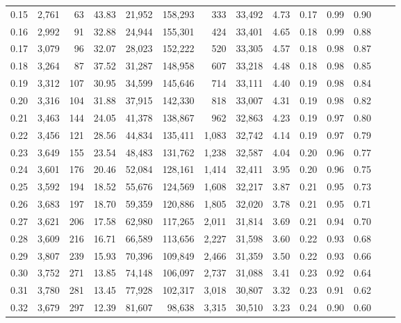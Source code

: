\begin{tabular}{rrrrrrrrrrrrrr}
0.15 &  2,761 &   63 &   43.83 &   21,952 &  158,293 &     333 &  33,492 &  4.73 &  0.17 &  0.99 &      0.90 \\
0.16 &  2,992 &   91 &   32.88 &   24,944 &  155,301 &     424 &  33,401 &  4.65 &  0.18 &  0.99 &      0.88 \\
0.17 &  3,079 &   96 &   32.07 &   28,023 &  152,222 &     520 &  33,305 &  4.57 &  0.18 &  0.98 &      0.87 \\
0.18 &  3,264 &   87 &   37.52 &   31,287 &  148,958 &     607 &  33,218 &  4.48 &  0.18 &  0.98 &      0.85 \\
0.19 &  3,312 &  107 &   30.95 &   34,599 &  145,646 &     714 &  33,111 &  4.40 &  0.19 &  0.98 &      0.84 \\
0.20 &  3,316 &  104 &   31.88 &   37,915 &  142,330 &     818 &  33,007 &  4.31 &  0.19 &  0.98 &      0.82 \\
0.21 &  3,463 &  144 &   24.05 &   41,378 &  138,867 &     962 &  32,863 &  4.23 &  0.19 &  0.97 &      0.80 \\
0.22 &  3,456 &  121 &   28.56 &   44,834 &  135,411 &   1,083 &  32,742 &  4.14 &  0.19 &  0.97 &      0.79 \\
0.23 &  3,649 &  155 &   23.54 &   48,483 &  131,762 &   1,238 &  32,587 &  4.04 &  0.20 &  0.96 &      0.77 \\
0.24 &  3,601 &  176 &   20.46 &   52,084 &  128,161 &   1,414 &  32,411 &  3.95 &  0.20 &  0.96 &      0.75 \\
0.25 &  3,592 &  194 &   18.52 &   55,676 &  124,569 &   1,608 &  32,217 &  3.87 &  0.21 &  0.95 &      0.73 \\
0.26 &  3,683 &  197 &   18.70 &   59,359 &  120,886 &   1,805 &  32,020 &  3.78 &  0.21 &  0.95 &      0.71 \\
0.27 &  3,621 &  206 &   17.58 &   62,980 &  117,265 &   2,011 &  31,814 &  3.69 &  0.21 &  0.94 &      0.70 \\
0.28 &  3,609 &  216 &   16.71 &   66,589 &  113,656 &   2,227 &  31,598 &  3.60 &  0.22 &  0.93 &      0.68 \\
0.29 &  3,807 &  239 &   15.93 &   70,396 &  109,849 &   2,466 &  31,359 &  3.50 &  0.22 &  0.93 &      0.66 \\
0.30 &  3,752 &  271 &   13.85 &   74,148 &  106,097 &   2,737 &  31,088 &  3.41 &  0.23 &  0.92 &      0.64 \\
0.31 &  3,780 &  281 &   13.45 &   77,928 &  102,317 &   3,018 &  30,807 &  3.32 &  0.23 &  0.91 &      0.62 \\
0.32 &  3,679 &  297 &   12.39 &   81,607 &   98,638 &   3,315 &  30,510 &  3.23 &  0.24 &  0.90 &      0.60 \\

\end{tabular}
